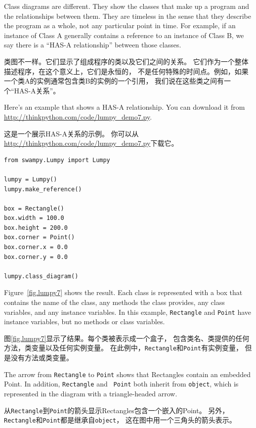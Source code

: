 \documentclass[10pt]{book}
\begin{document}
\begin{CJK}{UTF8}{gbsn}
Class diagrams are different.  They show the classes that make up a
program and the relationships between them.  They are timeless in the
sense that they describe the program as a whole, not any particular
point in time.  For example, if an instance of Class A generally
contains a reference to an instance of Class B, we say there is a
``HAS-A relationship'' between those classes.

类图不一样。它们显示了组成程序的类以及它们之间的关系。
它们作为一个整体描述程序，在这个意义上，它们是永恒的，
不是任何特殊的时间点。例如，如果一个类A的实例通常包含类B的实例的一个引用，
我们说在这些类之间有一个``HAS-A关系''。

Here's an example that shows a HAS-A relationship.  You can download
it from \url{http://thinkpython.com/code/lumpy_demo7.py}.

这是一个展示HAS-A关系的示例。
你可以从\url{http://thinkpython.com/code/lumpy_demo7.py}下载它。

\begin{verbatim}
from swampy.Lumpy import Lumpy

lumpy = Lumpy()
lumpy.make_reference()

box = Rectangle()
box.width = 100.0
box.height = 200.0
box.corner = Point()
box.corner.x = 0.0
box.corner.y = 0.0

lumpy.class_diagram()
\end{verbatim}

Figure~\ref{fig.lumpy7} shows the result.  
Each class is represented with a box that contains the name of the
class, any methods the class provides, any class variables, and
any instance variables.  In this example, {\tt Rectangle} and {\tt Point}
have instance variables, but no methods or class variables.

图\ref{fig.lumpy7}显示了结果。每个类被表示成一个盒子，
包含类名、类提供的任何方法，类变量以及任何实例变量。
在此例中，{\tt Rectangle}和{\tt Point}有实例变量，
但是没有方法或类变量。

The arrow from {\tt Rectangle} to {\tt Point} shows that Rectangles
contain an embedded Point.  In addition, {\tt Rectangle} and {\tt
  Point} both inherit from {\tt object}, which is represented in
the diagram with a triangle-headed arrow.

从{\tt Rectangle}到{\tt Point}的箭头显示Rectangles包含一个嵌入的Point。
另外，{\tt Rectangle}和{\tt Point}都是继承自{\tt object}，
这在图中用一个三角头的箭头表示。


\end{CJK}
\end{document}
